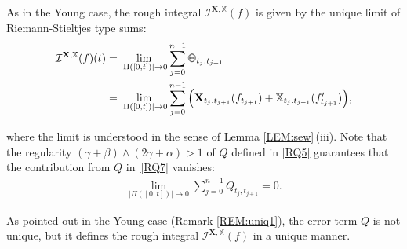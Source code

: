 \documentclass[letterpaper, 11pt,  reqno]{amsart}
\newcommand{\1}{\hspace{0.5mm}\textup{I}\hspace{0.5mm}}
\newcommand{\I}{\mathcal{I}}
\newcommand{\noi}{\noindent}
\newcommand{\al}{\alpha}
\newcommand{\be}{\beta}
\newcommand{\g}{\gamma}
\newcommand{\XXb}{\mathbb{X}}
\newcommand{\XX}{\mathbf{X}}
\def\doublestroke#1{\pdfliteral{1 Tr .35 w}#1\pdfliteral{0 Tr 0 w}}
\newcommand{\Taa}{\doublestroke{\Theta}}
\numberwithin{equation}{section}
\numberwithin{theorem}{section}
\begin{document}
\noi
As in the Young case, 
the rough integral $\I^{\XX, \XXb}(f)$ 
is given by 
the unique limit of 
Riemann-Stieltjes type sums:
\begin{align}
\begin{split}
\I^{\XX, \XXb}(f)(t) 
& = \lim_{|\Pi([0,t])|\to 0} 
\sum^{n-1}_{j=0} \Taa_{t_j,t_{j+1}}\\
& = \lim_{|\Pi([0,t])|\to 0} 
\sum^{n-1}_{j=0} \Big(\XX_{t_j,t_{j+1}}(f_{t_{j+1}})
+ \XXb_{t_j,t_{j+1}}(f_{t_{j+1}}')\Big), 
\end{split}
\label{RQ7}
\end{align} 
 
 
 
\noi
 where 
the limit is understood in the sense of Lemma \ref{LEM:sew}\,(iii).
Note that the regularity 
$(\g + \be)\wedge (2\g + \al) > 1$
of $Q$ defined in \eqref{RQ5}
guarantees that the contribution from $Q$ in~\eqref{RQ7}
vanishes:
\begin{align}
 \lim_{|\Pi([0,t])|\to 0} 
\sum^{n-1}_{j=0} Q_{t_j,t_{j+1}} = 0.
\label{RQ8}
\end{align} 
 
\noi
As pointed out in the Young case
(Remark \ref{REM:uniq1}), 
the error term $Q$ is not unique, 
but it defines
the rough integral 
$\I^{\XX, \XXb}(f)$  in a unique manner.
\end{document}
